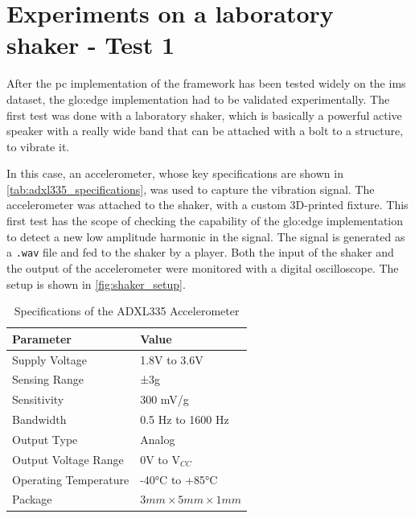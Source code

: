 \section{Experiments on a laboratory shaker - Test 1}
\label{sec:shaker_test01}

After the \gls{pc} implementation of the framework has been tested widely on the \gls{ims} dataset, the \gls{glo:edge} implementation had to be validated experimentally. The first test was done with a laboratory shaker, which is basically a powerful active speaker with a really wide band that can be attached with a bolt to a structure, to vibrate it.

In this case, an accelerometer, whose key specifications are shown in \autoref{tab:adxl335_specifications}, was used to capture the vibration signal. The accelerometer was attached to the shaker, with a custom 3D-printed fixture. This first test has the scope of checking the capability of the \gls{glo:edge} implementation to detect a new low amplitude harmonic in the signal. The signal is generated as a \texttt{.wav} file and fed to the shaker by a player. Both the input of the shaker and the output of the accelerometer were monitored with a digital oscilloscope. The setup is shown in \autoref{fig:shaker_setup}.



\begin{table}[h]
    \centering
    \caption{Specifications of the ADXL335 Accelerometer}
    \label{tab:adxl335_specifications}
    \begin{tabular}{ll} 
    \toprule
    \textbf{Parameter} & \textbf{Value} \\ 
    \hline
    Supply Voltage & 1.8V to 3.6V \\
    Sensing Range & ±3g \\
    Sensitivity & 300 mV/g \\
    Bandwidth & 0.5 Hz to 1600 Hz \\
    Output Type & Analog \\
    Output Voltage Range & 0V to V$_{CC}$ \\
    Operating Temperature & -40°C to +85°C \\
    Package & $3\si{mm} \times 5 \si{mm} \times 1 \si{mm}$ \\
    \bottomrule
    \end{tabular}
\end{table}

